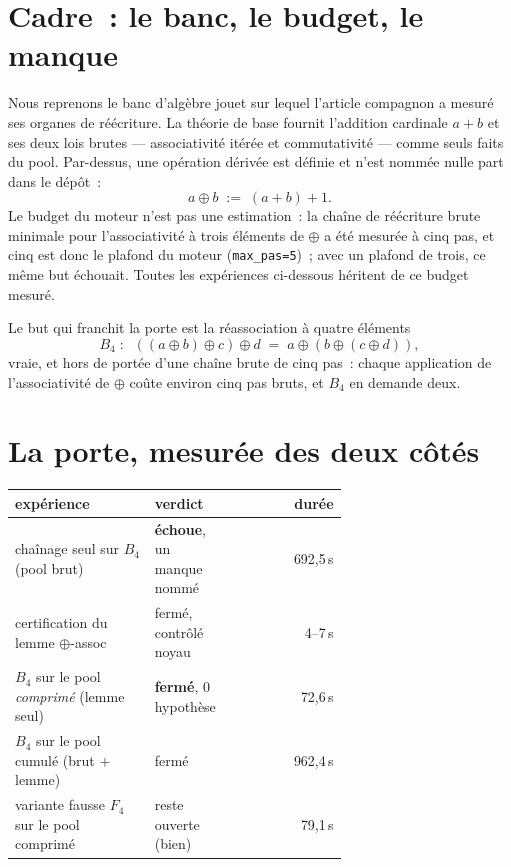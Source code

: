 \documentclass[11pt]{article}
\theoremstyle{remark}\newtheorem{remarque}{Remarque}
\begin{document}
\section{Cadre~: le banc, le budget, le manque}
\label{sec:background}

Nous reprenons le banc d'algèbre jouet sur lequel l'article compagnon a
mesuré ses organes de réécriture. La théorie de base fournit l'addition
cardinale $a+b$ et ses deux lois brutes --- associativité itérée et
commutativité --- comme seuls faits du pool. Par-dessus, une opération
dérivée est définie et n'est nommée nulle part dans le dépôt~:
\[
a \oplus b \;:=\; (a+b)+1 .
\]
Le budget du moteur n'est pas une estimation~: la chaîne de réécriture brute
minimale pour l'associativité à trois éléments de $\oplus$ a été mesurée à
cinq pas, et cinq est donc le plafond du moteur (\texttt{max\_pas=5})~; avec
un plafond de trois, ce même but échouait. Toutes les expériences ci-dessous
héritent de ce budget mesuré.

Le but qui franchit la porte est la réassociation à quatre éléments
\[
B_4 \;:\;\; ((a \oplus b) \oplus c) \oplus d \;=\; a \oplus (b \oplus (c
\oplus d)),
\]
vraie, et hors de portée d'une chaîne brute de cinq pas~: chaque application
de l'associativité de $\oplus$ coûte environ cinq pas bruts, et $B_4$ en
demande deux.

\section{La porte, mesurée des deux côtés}
\label{sec:porte}

\begin{center}\small
\begin{tabular}{@{}L{0.42\linewidth}L{0.24\linewidth}r@{}}
\toprule
expérience & verdict & durée \\
\midrule
chaînage seul sur $B_4$ (pool brut) & \textbf{échoue}, un manque nommé & 692,5\,s \\
certification du lemme $\oplus$-assoc & fermé, contrôlé noyau & 4--7\,s \\
$B_4$ sur le pool \emph{comprimé} (lemme seul) & \textbf{fermé}, 0 hypothèse & 72,6\,s \\
$B_4$ sur le pool cumulé (brut $+$ lemme) & fermé & 962,4\,s \\
variante fausse $F_4$ sur le pool comprimé & reste ouverte (bien) & 79,1\,s \\
\bottomrule
\end{tabular}
\end{center}
\end{document}
